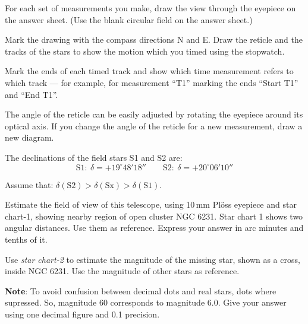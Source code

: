 For each set of measurements you make, draw the view through the eyepiece on
the answer sheet. (Use the blank circular field on the answer sheet.)

Mark the drawing with the compass directions N and E. Draw the reticle and the
tracks of the stars to show the motion which you timed using the stopwatch.

Mark the ends of each timed track and show which time measurement refers to
which track --- for example, for measurement ``T1'' marking the ends
``Start T1'' and ``End T1''.

The angle of the reticle can be easily adjusted by rotating the eyepiece
around its optical axis. If you change the angle of the reticle for a new
measurement, draw a new diagram.

The declinations of the field stars S1 and S2 are:
\[ \mathrm{S1}: \ \delta = +19^\circ 48' 18'' \qquad
   \mathrm{S2}: \ \delta = +20^\circ 06' 10'' \]

Assume that: $\delta(\mathrm{S2}) > \delta(\mathrm{Sx}) >
\delta(\mathrm{S1})$.

Estimate the field of view of this telescope, using 10\,mm Pl\"oss eyepiece
and star chart-1, showing nearby region of open cluster NGC 6231. Star chart
1 shows two angular distances. Use them as reference. Express your answer in
arc minutes and tenths of it.


Use \emph{star chart-2} to estimate the magnitude of the missing star, shown
as a cross, inside NGC 6231. Use the magnitude of other stars as reference.

\textbf{Note}: To avoid confusion between decimal dots and real stars, dots
where supressed. %
So, magnitude 60 corresponds to magnitude 6.0. Give your
answer using one decimal figure and 0.1 precision.


